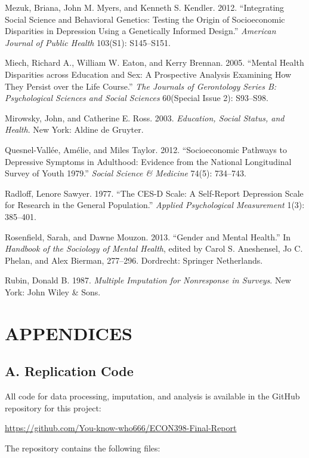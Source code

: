 \documentclass[
  12pt,
]{article}
\begin{document}
Mezuk, Briana, John M. Myers, and Kenneth S. Kendler. 2012.
``Integrating Social Science and Behavioral Genetics: Testing the Origin
of Socioeconomic Disparities in Depression Using a Genetically Informed
Design.'' \emph{American Journal of Public Health} 103(S1): S145--S151.

Miech, Richard A., William W. Eaton, and Kerry Brennan. 2005. ``Mental
Health Disparities across Education and Sex: A Prospective Analysis
Examining How They Persist over the Life Course.'' \emph{The Journals of
Gerontology Series B: Psychological Sciences and Social Sciences}
60(Special Issue 2): S93--S98.

Mirowsky, John, and Catherine E. Ross. 2003. \emph{Education, Social
Status, and Health}. New York: Aldine de Gruyter.

Quesnel-Vallée, Amélie, and Miles Taylor. 2012. ``Socioeconomic Pathways
to Depressive Symptoms in Adulthood: Evidence from the National
Longitudinal Survey of Youth 1979.'' \emph{Social Science \& Medicine}
74(5): 734--743.

Radloff, Lenore Sawyer. 1977. ``The CES-D Scale: A Self-Report
Depression Scale for Research in the General Population.'' \emph{Applied
Psychological Measurement} 1(3): 385--401.

Rosenfield, Sarah, and Dawne Mouzon. 2013. ``Gender and Mental Health.''
In \emph{Handbook of the Sociology of Mental Health}, edited by Carol S.
Aneshensel, Jo C. Phelan, and Alex Bierman, 277--296. Dordrecht:
Springer Netherlands.

Rubin, Donald B. 1987. \emph{Multiple Imputation for Nonresponse in
Surveys}. New York: John Wiley \& Sons.

\newpage

\section{APPENDICES}\label{appendices}

\subsection{A. Replication Code}\label{a.-replication-code}

All code for data processing, imputation, and analysis is available in
the GitHub repository for this project:

\url{https://github.com/You-know-who666/ECON398-Final-Report}

The repository contains the following files:
\end{document}
